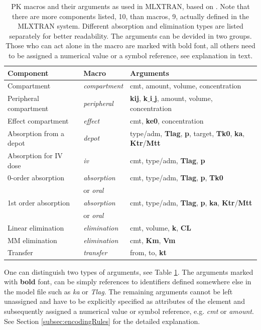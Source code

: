 \begin{table}[ht!]
\centering
\begin{tabular}{lll}
  \hline
  \hline
Component & Macro & Arguments \\
  \hline
Compartment 			& \textit{compartment}	 	& cmt, amount, volume, concentration \\
Peripheral compartment	& \textit{peripheral}			& \textbf{kij}, \textbf{k$\_$i$\_$j}, amount, volume, concentration \\
Effect compartment 		& \textit{effect} 				& cmt, \textbf{ke0}, concentration \\
Absorption from a depot 	& \textit{depot} 				& type/adm, \textbf{Tlag}, \textbf{p}, target, \textbf{Tk0}, \textbf{ka}, \textbf{Ktr}/\textbf{Mtt} \\
Absorption for IV dose 	& \textit{iv} 				& cmt, type/adm, \textbf{Tlag}, \textbf{p} \\
0-order absorption 		& \textit{absorption}			& cmt, type/adm, \textbf{Tlag}, \textbf{p}, \textbf{Tk0} \\[-.5ex]
					& or \textit{oral}				& \\
1st order absorption 	& \textit{absorption}			& cmt, type/adm, \textbf{Tlag}, \textbf{p}, \textbf{ka}, \textbf{Ktr}/\textbf{Mtt} \\[-.5ex]
					& or \textit{oral}				& \\
Linear elimination 		& \textit{elimination}			& cmt, volume, \textbf{k}, \textbf{CL} \\
MM elimination 		& \textit{elimination}			& cmt, \textbf{Km}, \textbf{Vm} \\
Transfer 				& \textit{transfer}			& from, to, \textbf{kt} \\
  \hline
\end{tabular}
\caption{PK macros and their arguments as used in MLXTRAN, based on 
\cite{MLXTRANforMonolix:2014}. Note that there are more components listed, 
10, than macros, 9, actually defined in the MLXTRAN system. Different absorption 
and elimination types are listed separately for better readability. The arguments can be 
devided in two groups. Those who can act alone in the macro are marked with bold font,
all others need to be assigned a numerical value or a symbol reference, see explanation in text.}
\label{tab:MLXPLORElibrary}
\end{table}
One can distinguish two types of arguments, see Table \ref{tab:MLXPLORElibrary}. 
The arguments marked with \textbf{bold} font, can be simply references to identifiers 
defined somewhere else in the model file such as \emph{ka} or \emph{Tlag}. The remaining 
arguments cannot be left unassigned and have to be explicitly specified as attributes 
of the  element and subsequently assigned a numerical value or 
symbol reference, e.g. \emph{cmt} or \emph{amount}. See Section 
\ref{subsec:encodingRules} for the detailed explanation.

